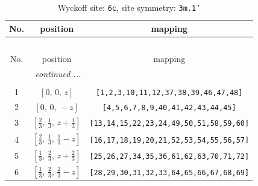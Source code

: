 \documentclass[fleqn,8pt]{jsarticle}
\begin{document}
\renewcommand{\arraystretch}{1.2}
\begin{longtable}{ccc}
\caption{Wyckoff site: {\tt 6c}, site symmetry: {\tt 3m.1'}}
 \\
 \hline \hline
No. & position & mapping \\ \hline \endfirsthead

\multicolumn{2}{l}{\tablename\ \thetable{}} \\
 \hline \hline
No. & position & mapping \\ \hline \endhead

 \hline \hline
\multicolumn{2}{r}{\footnotesize\it continued ...} \\ \endfoot

 \hline \hline
\multicolumn{2}{r}{} \\ \endlastfoot

1 & $\left[ 0,\, 0,\, z \right]$ & {\tt [1,2,3,10,11,12,37,38,39,46,47,48]} \\ \hline
2 & $\left[ 0,\, 0,\, - z \right]$ & {\tt [4,5,6,7,8,9,40,41,42,43,44,45]} \\ \hline
3 & $\left[ \frac{2}{3},\, \frac{1}{3},\, z + \frac{1}{3} \right]$ & {\tt [13,14,15,22,23,24,49,50,51,58,59,60]} \\ \hline
4 & $\left[ \frac{2}{3},\, \frac{1}{3},\, \frac{1}{3} - z \right]$ & {\tt [16,17,18,19,20,21,52,53,54,55,56,57]} \\ \hline
5 & $\left[ \frac{1}{3},\, \frac{2}{3},\, z + \frac{2}{3} \right]$ & {\tt [25,26,27,34,35,36,61,62,63,70,71,72]} \\ \hline
6 & $\left[ \frac{1}{3},\, \frac{2}{3},\, \frac{2}{3} - z \right]$ & {\tt [28,29,30,31,32,33,64,65,66,67,68,69]} \\
\end{longtable}
\renewcommand{\arraystretch}{1.2}
\end{document}
